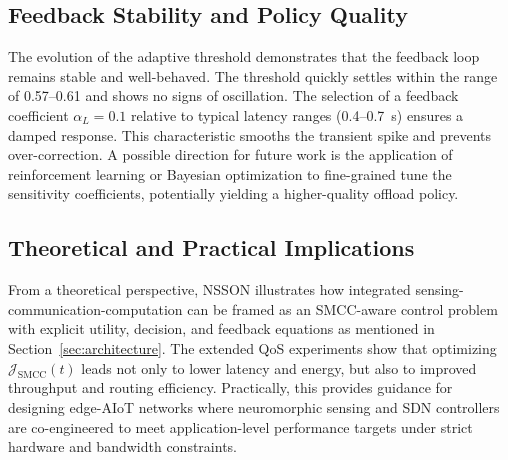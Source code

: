 \documentclass[journal]{IEEEtran}
\begin{document}
\subsection{Feedback Stability and Policy Quality}
The evolution of the adaptive threshold demonstrates that the feedback loop remains stable and well-behaved. The threshold quickly settles within the range of 0.57--0.61 and shows no signs of oscillation. The selection of a feedback coefficient $\alpha_L = 0.1$ relative to typical latency ranges (0.4--0.7~s) ensures a damped response. This characteristic smooths the transient spike and prevents over-correction. A possible direction for future work is the application of reinforcement learning or Bayesian optimization to fine-grained tune the sensitivity coefficients, potentially yielding a higher-quality offload policy.

\subsection{Theoretical and Practical Implications}

From a theoretical perspective, NSSON illustrates how integrated sensing-communication-computation can be framed as an SMCC-aware control problem with explicit utility, decision, and feedback equations as mentioned in Section~\ref{sec:architecture}. The extended QoS experiments show that optimizing $\mathcal{J}_{\mathrm{SMCC}}(t)$ leads not only to lower latency and energy, but also to improved throughput and routing efficiency. Practically, this provides guidance for designing edge-AIoT networks where neuromorphic sensing and SDN controllers are co-engineered to meet application-level performance targets under strict hardware and bandwidth constraints.
\end{document}
